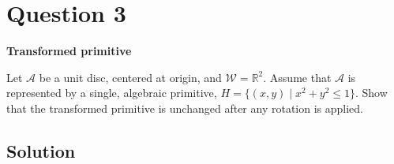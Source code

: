 \section*{Question 3}

\textbf{Transformed primitive}

Let \( \mathcal{A} \) be a unit disc, centered at origin, and \( \mathcal{W} = \mathbb{R}^2 \).
Assume that \( \mathcal{A} \) is represented by a single, algebraic primitive, \( H = \{ (x, y) \mid x^2 + y^2 \leq 1 \} \).
Show that the transformed primitive is unchanged after any rotation is applied.

\subsection*{Solution}
